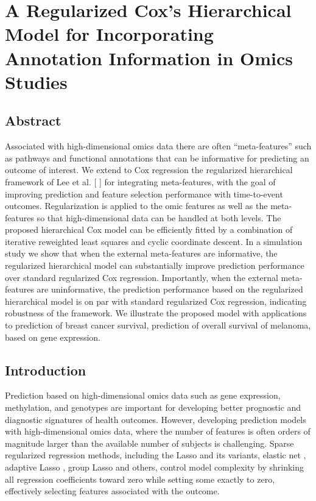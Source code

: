 \chapter{A Regularized Cox’s Hierarchical Model for Incorporating Annotation Information in Omics Studies}
\label{cha:xrnetcox}

\section{Abstract}
Associated with high-dimensional omics data there are often “meta-features” such as pathways and functional annotations that can be informative for predicting an outcome of interest. We extend to Cox regression the regularized hierarchical framework of Lee et al. [ ] for integrating meta-features, with the goal of improving prediction and feature selection performance with time-to-event outcomes. Regularization is applied to the omic features as well as the meta-features so that high-dimensional data can be handled at both levels. The proposed hierarchical Cox model can be efficiently fitted by a combination of iterative reweighted least squares and cyclic coordinate descent. In a simulation study we show that when the external meta-features are informative, the regularized hierarchical model can substantially improve prediction performance over standard regularized Cox regression. Importantly, when the external meta-features are uninformative, the prediction performance based on the regularized hierarchical model is on par with standard regularized Cox regression, indicating robustness of the framework. We illustrate the proposed model with applications to prediction of breast cancer survival, prediction of overall survival of melanoma, based on gene expression.

\section{Introduction}
Prediction based on high-dimensional omics data such as gene expression, methylation, and genotypes are important for developing better prognostic and diagnostic signatures of health outcomes. However, developing prediction models with high-dimensional omics data, where the number of features is often orders of magnitude larger than the available number of subjects is challenging. Sparse regularized regression methods, including the Lasso \citep{tibshirani1996regression} and its variants, elastic net \citep{zou2005regularization}, adaptive Lasso \citep{zou2006adaptive}, group Lasso \citep{yuan2006model} and others, control model complexity by shrinking all regression coefficients toward zero while setting some exactly to zero, effectively selecting features associated with the outcome. 

